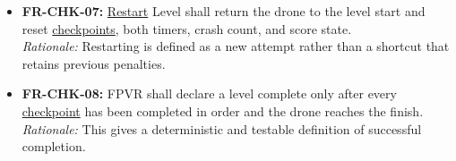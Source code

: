 \documentclass[12pt]{article}
\begin{document}
\begin{itemize}
\textit{Rationale:} Repeated failed attempts must continue to affect the overall performance result.
\item \hypertarget{req:FR-CHK-07}{}\textbf{FR-CHK-07:} \hyperlink{glos:Respawn}{Restart} Level shall return the drone to the level start and reset \hyperlink{glos:Checkpoint}{checkpoints}, both timers, crash count, and score state.\\
\textit{Rationale:} Restarting is defined as a new attempt rather than a shortcut that retains previous penalties.
\item \hypertarget{req:FR-CHK-08}{}\textbf{FR-CHK-08:} FPVR shall declare a level complete only after every \hyperlink{glos:Checkpoint}{checkpoint} has been completed in order and the drone reaches the finish.\\
\textit{Rationale:} This gives a deterministic and testable definition of successful completion.
\end{itemize}
\end{document}
